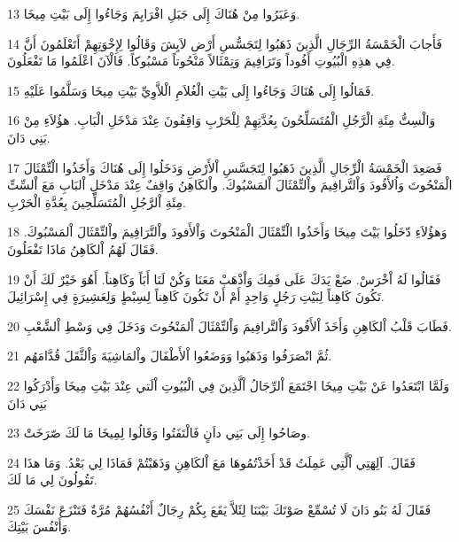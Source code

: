 \par 13 وَعَبَرُوا مِنْ هُنَاكَ إِلَى جَبَلِ افْرَايِمَ وَجَاءُوا إِلَى بَيْتِ مِيخَا.
\par 14 فَأَجابَ الْخَمْسَةُ الرِّجَالِ الَّذِينَ ذَهَبُوا لِتَجَسُّسِ أَرْضِ لاَيِشَ وَقَالُوا لِإِخْوَتِهِمْ أَتَعْلَمُونَ أَنَّ فِي هذِهِ الْبُيُوتِ أَفُوداً وَتَرَافِيمَ وَتِمْثَالاً مَنْحُوتاً مَسْبُوكاً. فَالْآنَ اعْلَمُوا مَا تَفْعَلُونَ.
\par 15 فَمَالُوا إِلَى هُنَاكَ وَجَاءُوا إِلَى بَيْتِ الْغُلاَمِ الْلاَّوِيِّ بَيْتِ مِيخَا وَسَلَّمُوا عَلَيْهِ.
\par 16 وَالْسِتُّ مِئَةِ الْرَّجُلِ الْمُتَسَلِّحُونَ بِعُدَّتِهِمْ لِلْحَرْبِ وَاقِفُونَ عِنْدَ مَدْخَلِ الْبَابِ. هؤُلاَءِ مِنْ بَنِي دَانَ.
\par 17 فَصَعِدَ الْخَمْسَةُ الْرِّجَالِ الَّذِينَ ذَهَبُوا لِتَجَسَّسِ اْلأَرْضِ وَدَخَلُوا إِلَى هُنَاكَ وَأَخَذُوا الْتِّمْثَالَ الْمَنْحُوتَ وَاُلأَفُودَ وَاْلتَّرافِيمَ واْلتِّمْثَالَ اْلمَسْبُوكَ. واْلكَاهِنُ وَاقِفٌ عِنْدَ مَدْخَلِ اْلبَابِ مَعَ اْلسِّتِّ مِئَةِ اْلرَّجُلِ الْمُتَسَلِّحِينَ بِعُدَّةِ الْحَرْبِ.
\par 18 وَهؤُلاَءِ دّخَلُوا بَيْتَ مِيخَا وَأَخَذُوا الْتِّمْثَالَ الْمَنْحُوتَ وَاْلأَفودَ واْلتَّرَافِيمَ واْلتِّمْثَالَ اْلمَسْبُوكَ. فَقَالَ لَهُمُ اْلكَاهِنُ مَاذَا تَفْعَلُونَ.
\par 19 فَقَالُوا لَهُ اْخْرَسْ. ضَعْ يَدَكَ عَلَى فَمِكَ وَاْذْهَبْ مَعَنَا وَكُنْ لَنَا أَبَاً وَكَاهِناً. أَهُوَ خَيْرٌ لَكَ أَنْ تَكُونَ كَاهِناً لِبَيْتِ رَجُلٍ وَاحِدٍ أَمْ أَنْ تَكُونَ كَاهِناً لِسِبْطٍ وَلِعَشِيرَةٍ فِي إِسْرَائِيلَ.
\par 20 فَطَابَ قَلْبُ اْلكَاهِنِ وَأَخَذَ اْلأَفُودَ وَاْلتَّرافِيمَ وَاْلتِّمْثَالَ اْلمَنْحُوتَ وَدَخَلَ فِي وَسْطِ اْلشَّعْبِ.
\par 21 ثُمَّ انْصَرَفُوا وَذَهَبُوا وَوَضَعُوا اْلأَطْفَالَ واْلمَاشِيَةَ وَاْلثَّقَلَ قُدَّامَهُم.
\par 22 وَلَمَّا ابْتَعَدُوا عَنْ بَيْتِ مِيخَا اجْتَمَعَ اْلرِّجَالُ اْلَّذِينَ فِي الْبُيُوتِ اْلَتي عِنْدَ بَيْتِ مِيخَا وَأَدْرَكُوا بَنِي دَانَ
\par 23 وصَاحُوا إِلَى بَنِي داَنٍ فَالْتَفَتُوا وَقَالُوا لِمِيخَا مَا لَكَ صّرَخَتْ.
\par 24 فَقَالَ. آلِهَتِي اْلَّتِي عَمِلَتُ قَدْ أَخَذْتُمُوهَا مَعَ اْلكَاهِنِ وَذَهَبْتُمْ فَمَاذَا لِي بَعْدُ. وَمَا هذَا تَقُولُونَ لِي مَا لَكَ.
\par 25 فَقَالَ لَهُ بَنُو دَانَ لَا تُسْمِّعْ صَوْتَكَ بَيْنَنَا لِئَلاَّ يَقَعَ بِكُمْ رِجَالٌ أَنْفُسُهُمْ مُرَّةٌ فَتَنْزَعَ نَفْسَكَ وَأَنْفُسَ بَيْتِكَ.
